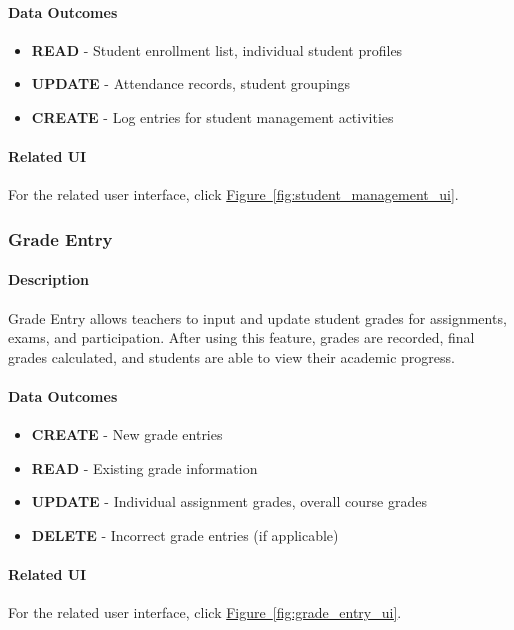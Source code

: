 \documentclass[12pt]{article}
\begin{document}
\paragraph{Data Outcomes}
\begin{itemize}
    \item \textbf{READ} - Student enrollment list, individual student profiles
    \item \textbf{UPDATE} - Attendance records, student groupings
    \item \textbf{CREATE} - Log entries for student management activities
\end{itemize}

\paragraph{Related UI}
For the related user interface, click \hyperref[fig:student_management_ui]{Figure~\ref*{fig:student_management_ui}}.

\subsubsection{Grade Entry}

\paragraph{Description}
Grade Entry allows teachers to input and update student grades for assignments, exams, and participation. After using this feature, grades are recorded, final grades calculated, and students are able to view their academic progress.

\paragraph{Data Outcomes}
\begin{itemize}
    \item \textbf{CREATE} - New grade entries
    \item \textbf{READ} - Existing grade information
    \item \textbf{UPDATE} - Individual assignment grades, overall course grades
    \item \textbf{DELETE} - Incorrect grade entries (if applicable)
\end{itemize}

\paragraph{Related UI}
For the related user interface, click \hyperref[fig:grade_entry_ui]{Figure~\ref*{fig:grade_entry_ui}}.
\end{document}

